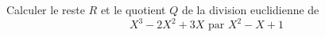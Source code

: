 Calculer le reste $R$ et le quotient $Q$ de la division euclidienne de
\begin{displaymath}
 {X}^{3}-2{X}^{2}+3X \text{ par } X^2-X+1
\end{displaymath}
\bigskip \bigskip